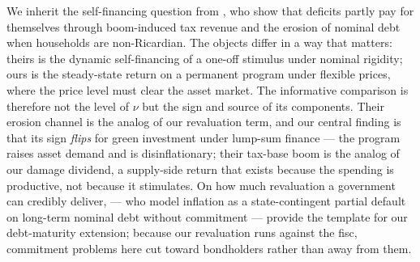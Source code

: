 \documentclass[12pt]{article}
\begin{document}
We inherit the self-financing question from
\citet{angeletos2024deficits}, who show that deficits partly pay for
themselves through boom-induced tax revenue and the erosion of nominal debt
when households are non-Ricardian. The objects differ in a way that matters:
theirs is the dynamic self-financing of a one-off stimulus under nominal
rigidity; ours is the steady-state return on a permanent program under
flexible prices, where the price level must clear the asset market. The
informative comparison is therefore not the level of $\nu$ but the sign and
source of its components. Their erosion channel is the analog of our
revaluation term, and our central finding is that its sign \emph{flips} for
green investment under lump-sum finance --- the program raises asset demand
and is disinflationary; their tax-base boom is the analog of our damage
dividend, a supply-side return that exists because the spending is
productive, not because it stimulates. On how much revaluation a government
can credibly deliver, \citet{hurtado2023sovereign} --- who model inflation as
a state-contingent partial default on long-term nominal debt without
commitment --- provide the template for our debt-maturity extension; because
our revaluation runs against the fisc, commitment problems here cut
toward bondholders rather than away from them.
\end{document}
